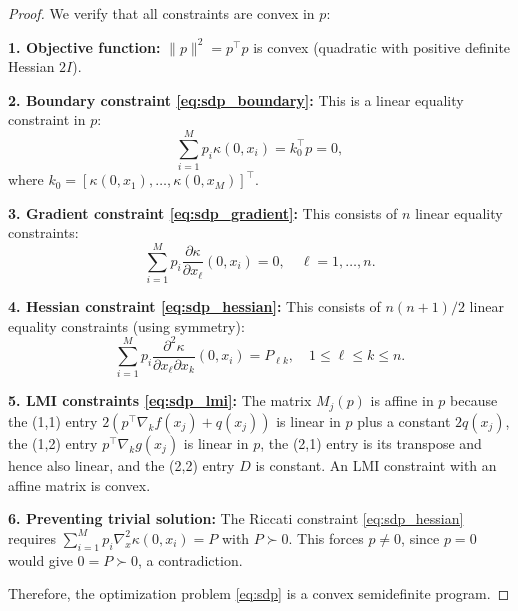 \documentclass[10pt,a4paper]{amsart}
\begin{document}
\begin{proof}
We verify that all constraints are convex in $p$:

\textbf{1. Objective function:} $\|p\|^2 = p^\top p$ is convex (quadratic with positive definite Hessian $2I$).

\textbf{2. Boundary constraint \eqref{eq:sdp_boundary}:} This is a linear equality constraint in $p$:
\[
\sum_{i=1}^M p_i \kappa(0, x_i) = k_0^\top p = 0,
\]
where $k_0 = [\kappa(0, x_1), \ldots, \kappa(0, x_M)]^\top$.

\textbf{3. Gradient constraint \eqref{eq:sdp_gradient}:} This consists of $n$ linear equality constraints:
\[
\sum_{i=1}^M p_i \frac{\partial \kappa}{\partial x_\ell}(0, x_i) = 0, \quad \ell = 1, \ldots, n.
\]

\textbf{4. Hessian constraint \eqref{eq:sdp_hessian}:} This consists of $n(n+1)/2$ linear equality constraints (using symmetry):
\[
\sum_{i=1}^M p_i \frac{\partial^2 \kappa}{\partial x_\ell \partial x_k}(0, x_i) = P_{\ell k}, \quad 1 \leq \ell \leq k \leq n.
\]

\textbf{5. LMI constraints \eqref{eq:sdp_lmi}:} The matrix $M_j(p)$ is affine in $p$ because the (1,1) entry $2(p^\top \nabla_k f(x_j) + q(x_j))$ is linear in $p$ plus a constant $2q(x_j)$, the (1,2) entry $p^\top \nabla_k g(x_j)$ is linear in $p$, the (2,1) entry is its transpose and hence also linear, and the (2,2) entry $D$ is constant. An LMI constraint with an affine matrix is convex.

\textbf{6. Preventing trivial solution:} The Riccati constraint \eqref{eq:sdp_hessian} requires $\sum_{i=1}^M p_i \nabla_x^2 \kappa(0, x_i) = P$ with $P \succ 0$. This forces $p \neq 0$, since $p = 0$ would give $0 = P \succ 0$, a contradiction.

Therefore, the optimization problem \eqref{eq:sdp} is a convex semidefinite program.
\end{proof}
\end{document}
